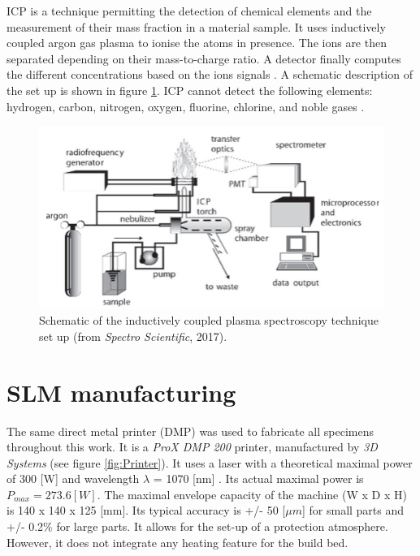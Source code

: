ICP is a technique permitting the detection of chemical elements and the measurement of their mass fraction in a material sample. It uses inductively coupled argon gas plasma to ionise the atoms in presence. The ions are then separated depending on their mass-to-charge ratio. A detector finally computes the different concentrations based on the ions signals \parencite{XRF}. A schematic description of the set up is shown in figure \ref{fig:ICP}. ICP cannot detect the following elements: hydrogen, carbon, nitrogen, oxygen, fluorine, chlorine, and noble gases \parencite{OHSU}.\\

\begin{figure}[ht]
\centering
\includegraphics[scale=0.6]{Images/ICP}
\decoRule
\caption[Schematic of the inductively coupled plasma spectroscopy technique set up.]{Schematic of the inductively coupled plasma spectroscopy technique set up (from \textit{Spectro Scientific}, 2017).}
\label{fig:ICP}
\end{figure}



\section{SLM manufacturing}
\label{MMFPP}
The same direct metal printer (DMP) was used to fabricate all specimens throughout this work. It is a \textit{ProX DMP 200} printer, manufactured by \textit{3D Systems} (see figure \ref{fig:Printer}). It uses a laser with a theoretical maximal power of 300 [W] and wavelength $\lambda$ = 1070 [nm] \parencite{3D}. Its actual maximal power is $P_{max}=273.6 [W]$. The maximal envelope capacity of the machine (W x D x H) is 140 x 140 x 125 [mm]. Its typical accuracy is +/- 50 [$\mu m$] for small parts and +/- 0.2\% for large parts. It allows for the set-up of a protection atmosphere. However, it does not integrate any heating feature for the build bed.\\

